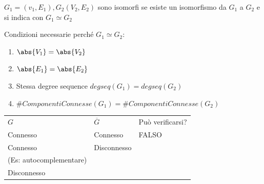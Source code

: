 \documentclass[11pt,a4paper,twoside,openright]{book}
\providecommand{\tightlist}{\setlength{\itemsep}{0pt}\setlength{\parskip}{0pt}}
\begin{document}
{{{$G_1=(v_1,E_1),G_2(V_2,E_2)$ sono isomorfi se esiste un isomorfismo da $G_1$ a $G_2$ e si indica con $G_1\simeq G_2$}

{Condizioni necessarie perché $G_1\simeq G_2$:}

\begin{enumerate}
\tightlist
\item
  $\abs{V_1}=\abs{V_2}$
\item
  $\abs{E_1}=\abs{E_2}$
\item
  {Stessa degree sequence $degseq(G_1) = degseq(G_2)$}
\item
  $\#ComponentiConnesse(G_1) = 	\#ComponentiConnesse(G_2)$
\end{enumerate}


\begin{longtable}[]{@{}lll@{}}
\toprule
\begin{minipage}[t]{0.30\columnwidth}\raggedright\strut
$G$\strut
\end{minipage} & \begin{minipage}[t]{0.30\columnwidth}\raggedright\strut
$\overline{G}$\strut
\end{minipage} & \begin{minipage}[t]{0.30\columnwidth}\raggedright\strut
{Può verificarsi?}\strut
\end{minipage}\tabularnewline
\begin{minipage}[t]{0.30\columnwidth}\raggedright\strut
{Connesso}\strut
\end{minipage} & \begin{minipage}[t]{0.30\columnwidth}\raggedright\strut
{Connesso}\strut
\end{minipage} & \begin{minipage}[t]{0.30\columnwidth}\raggedright\strut
{FALSO}\strut
\end{minipage}\tabularnewline
\begin{minipage}[t]{0.30\columnwidth}\raggedright\strut
{Connesso}\strut
\end{minipage} & \begin{minipage}[t]{0.30\columnwidth}\raggedright\strut
{Disconnesso}\strut
\end{minipage} & \begin{minipage}[t]{0.30\columnwidth}\raggedright\strut
{FALSO \\ (Es: autocomplementare)}\strut
\end{minipage}\tabularnewline
\begin{minipage}[t]{0.30\columnwidth}\raggedright\strut
{Disconnesso}\strut
\end{minipage} & \begin{minipage}[t]{0.30\columnwidth}\raggedright\strut

\end{minipage}
\end{longtable}}}
\end{document}
